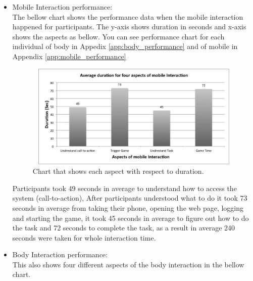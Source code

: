 \begin{itemize}

\item Mobile Interaction performance: \\
The bellow chart shows the performance data when the mobile interaction happened for participants. The y-axis shows duration in seconds and x-axis shows the aspects as bellow. You can see performance chart for each individual of body in Appedix \ref{app:body_performance} and of mobile in Appendix \ref{app:mobile_performance}

\begin{figure}[H]
\centering
\includegraphics[width=12cm,height=5cm]{Figures/6/mobile_average}%
 \caption{Chart that shows each aspect with respect to duration. }%
 \label{fig:mobile_average}%
\end{figure}

 Participants took 49 seconds in average to understand how to access the system (call-to-action), After participants understood what to do it took 73 seconds in average from taking their phone, opening the web page, logging and starting the game, it took 45 seconds in average to figure out how to do the task and 72 seconds to complete the task, as a result in average 240 seconds were taken for whole interaction time.

%


\item Body Interaction performance: \\
This also shows four different aspects of the body interaction in the bellow chart.


\end{itemize}
